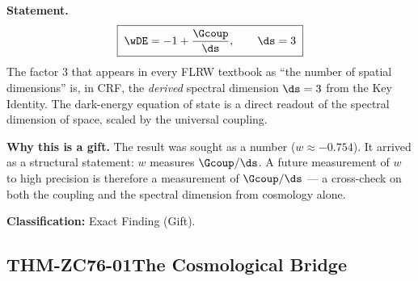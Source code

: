 \documentclass[12pt, a4paper]{article}
\begin{document}

\begin{giftbox}[title={FIND-ZC76-02: The Equation of State Encodes
  $d_s$ (Exact)}]

\textbf{Statement.}
\begin{equation}
  \boxed{\;\wDE = -1 + \frac{\Gcoup}{\ds},
  \qquad \ds = 3\;}
\end{equation}
The factor $3$ that appears in every FLRW textbook as ``the number of
spatial dimensions'' is, in CRF, the \emph{derived} spectral dimension
$\ds=3$ from the Key Identity. The dark-energy equation of state is a
direct readout of the spectral dimension of space, scaled by the
universal coupling.

\textbf{Why this is a gift.}
The result was sought as a number ($w\approx-0.754$). It arrived as a
structural statement: $w$ measures $\Gcoup/\ds$. A future measurement
of $w$ to high precision is therefore a measurement of $\Gcoup/\ds$ ---
a cross-check on both the coupling and the spectral dimension from
cosmology alone.

\textbf{Classification:} Exact Finding (Gift).
\end{giftbox}

\subsection{THM-ZC76-01\quad The Cosmological Bridge}
\label{sec:thm01}

\end{document}
